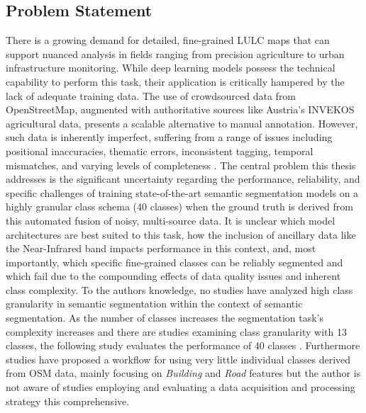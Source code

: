 \documentclass{report}
\begin{document}
\subsection{Problem Statement}
There is a growing demand for detailed, fine-grained LULC maps that can support nuanced analysis in fields ranging from precision agriculture to urban infrastructure monitoring. While deep learning models possess the technical capability to perform this task, their application is critically hampered by the lack of adequate training data. The use of crowdsourced data from OpenStreetMap, augmented with authoritative sources like Austria's INVEKOS agricultural data, presents a scalable alternative to manual annotation. However, such data is inherently imperfect, suffering from a range of issues including positional inaccuracies, thematic errors, inconsistent tagging, temporal mismatches, and varying levels of completeness \parencite[p.~2ff.]{UsmaniEtAlRemoteSensingDeepLearningUnderstandNoisyOpenStreetMap2023}.
The central problem this thesis addresses is the significant uncertainty regarding the performance, reliability, and specific challenges of training state-of-the-art semantic segmentation models on a highly granular class schema (40 classes) when the ground truth is derived from this automated fusion of noisy, multi-source data. It is unclear which model architectures are best suited to this task, how the inclusion of ancillary data like the Near-Infrared band impacts performance in this context, and, most importantly, which specific fine-grained classes can be reliably segmented and which fail due to the compounding effects of data quality issues and inherent class complexity. To the authors knowledge, no studies have analyzed high class granularity in semantic segmentation within the context of semantic segmentation. As the number of classes increases the segmentation task's complexity increases and there are studies examining class granularity with 13 classes, the following study evaluates the performance of 40 classes \parencite[p.~1ff.]{SertelEtAlLandUseLandCoverMappingUsingDeepLearningBasedSegmentationApproachesVHRWorldview3Images2022}. Furthermore studies have proposed a workflow for using very little individual classes derived from OSM data, mainly focusing on \textit{Building} and \textit{Road} features but the author is not aware of studies employing and evaluating a data acquisition and processing strategy this comprehensive. 
\end{document}
